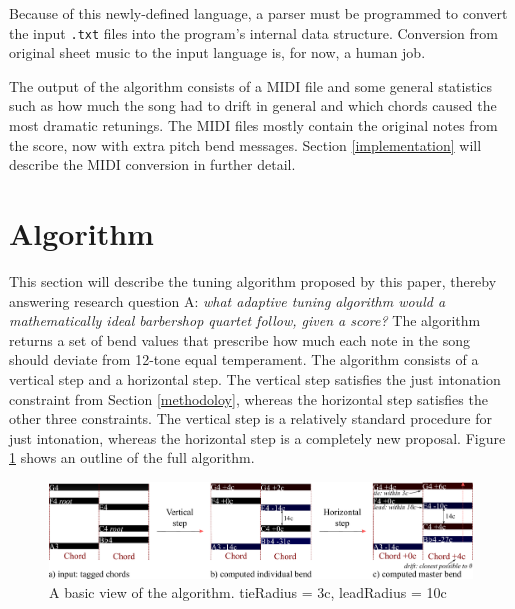 \documentclass[a4paper]{article}
\begin{document}
Because of this newly-defined language, a parser must be programmed to convert the input \verb+.txt+ files into the program's internal data structure. Conversion from original sheet music to the input language is, for now, a human job.

The output of the algorithm consists of a MIDI file\cite{midi_manufacturers_association_complete_2014} and some general statistics such as how much the song had to drift in general and which chords caused the most dramatic retunings. The MIDI files mostly contain the original notes from the score, now with extra pitch bend messages. Section \ref{implementation} will describe the MIDI conversion in further detail.


\section{Algorithm}
\label{algorithm}
This section will describe the tuning algorithm proposed by this paper, thereby answering research question A: {\it what adaptive tuning algorithm would a mathematically ideal barbershop quartet follow, given a score?} The algorithm returns a set of bend values that prescribe how much each note in the song should deviate from 12-tone equal temperament. The algorithm consists of a vertical step and a horizontal step. The vertical step satisfies the just intonation constraint from Section \ref{methodoloy}, whereas the horizontal step satisfies the other three constraints. The vertical step is a relatively standard procedure for just intonation, whereas the horizontal step is a completely new proposal. Figure \ref{fig:algo_outline} shows an outline of the full algorithm.

\begin{figure}
	\includegraphics[width=\linewidth]{Figures/algo_outline.pdf}
	\caption{A basic view of the algorithm. tieRadius = 3c, leadRadius = 10c}
	\label{fig:algo_outline}
\end{figure}
\end{document}
